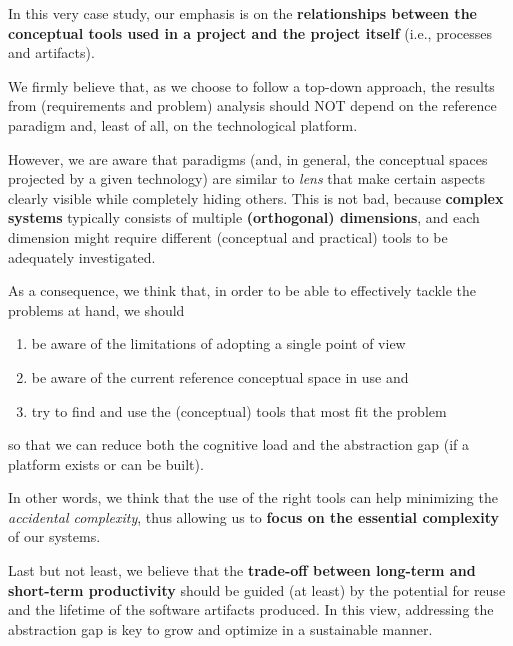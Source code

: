 \documentclass{article}
\newcommand{\mycolor}{myrgb}
\newcommand{\colorize}[1]{{\color{\mycolor}#1}}
\begin{document}
\colorize{
In this very case study, our emphasis is on
the \textbf{relationships between the conceptual tools used in a project and
the project itself} (i.e., processes and artifacts).

We firmly believe that, as we choose to follow a top-down approach, the results
from (requirements and problem) analysis should NOT depend on the reference paradigm
 and, least of all, on the technological platform. 
 
 However, we are aware that paradigms (and, in general, the conceptual spaces
 projected by a given technology) are similar to \emph{lens} that make certain
 aspects clearly visible while completely hiding others. This is not bad,
 because \textbf{complex systems} typically consists of multiple
 \textbf{(orthogonal) dimensions}, and each dimension might require different 
 (conceptual and practical) tools to be adequately investigated.
 
 As a consequence, we think that, in order to be able to effectively tackle the
 problems at hand, we should
 
 \begin{enumerate}
   \item be aware of the limitations of adopting a single point of view
   \item be aware of the current reference conceptual space in use and 
   \item try to find and use the (conceptual) tools that most fit the problem
 \end{enumerate}
 
 so that we can reduce both the cognitive load and the abstraction gap (if a
 platform exists or can be built).
 
 In other words, we think that the use of the right tools can help minimizing
 the \emph{accidental complexity}, thus allowing us to \textbf{focus on the
 essential complexity} of our systems. 
 
 Last but not least, we believe that the \textbf{trade-off between long-term and
 short-term productivity} should be guided (at least) by the potential for
 reuse and the lifetime of the software artifacts produced. In this view,
 addressing the abstraction gap is key to grow and optimize in a sustainable
 manner. }






\end{document}
